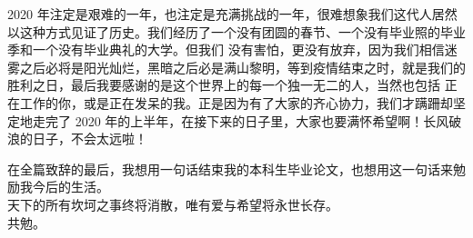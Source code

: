 2020 年注定是艰难的一年，也注定是充满挑战的一年，很难想象我们这代人居然以这种方式见证了历史。我们经历了一个没有团圆的春节、一个没有毕业照的毕业季和一个没有毕业典礼的大学。但我们
没有害怕，更没有放弃，因为我们相信迷雾之后必将是阳光灿烂，黑暗之后必是满山黎明，等到疫情结束之时，就是我们的胜利之日，最后我要感谢的是这个世界上的每一个独一无二的人，当然也包括
正在工作的你，或是正在发呆的我。正是因为有了大家的齐心协力，我们才蹒跚却坚定地走完了 2020 年的上半年，在接下来的日子里，大家也要满怀希望啊！长风破浪的日子，不会太远啦！

在全篇致辞的最后，我想用一句话结束我的本科生毕业论文，也想用这一句话来勉励我今后的生活。\\

天下的所有坎坷之事终将消散，唯有爱与希望将永世长存。\\

共勉。

